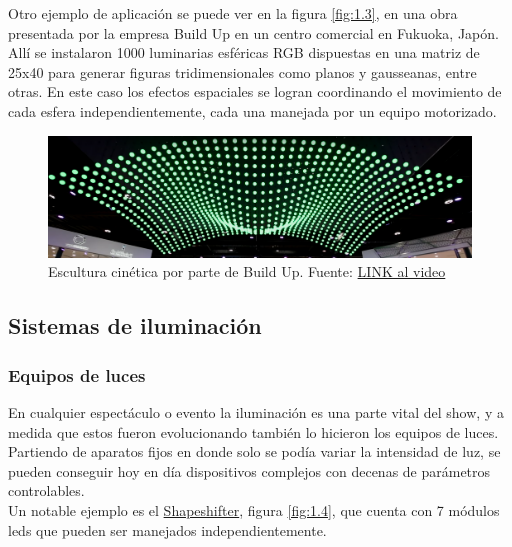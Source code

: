 Otro ejemplo de aplicación se puede ver en la figura \ref{fig:1.3}, en una obra presentada por la empresa Build Up en un centro comercial en Fukuoka, Japón. Allí se instalaron 1000 luminarias esféricas RGB dispuestas en una matriz de 25x40 para generar figuras tridimensionales como planos y gausseanas, entre otras. En este caso los efectos espaciales se logran coordinando el movimiento de cada esfera independientemente, cada una manejada por un equipo motorizado.
\begin{figure}[!ht]
	\centering
	\includegraphics[width=15cm,scale=1]{resources/1_3-kinSculp.png}
	\caption{ Escultura cinética por parte de Build Up. Fuente: \href{https://www.youtube.com/watch?v=ICixCazf6-k}{LINK al video} }
	\label{fig:\thefigure}
\end{figure}



\subsection{Sistemas de iluminación} 
\subsubsection{Equipos de luces}
En cualquier espectáculo o evento la iluminación es una parte vital del show, y a medida que estos fueron evolucionando también lo hicieron los equipos de luces. Partiendo de aparatos fijos en donde solo se podía variar la intensidad de luz, se pueden conseguir hoy en día dispositivos complejos con decenas de parámetros controlables.\\
Un notable ejemplo es el \href{http://preworks.at/index.php/en/products/led-automated-luminairies/shapeshifter}{Shapeshifter}, figura \ref{fig:1.4}, que cuenta con 7 módulos leds que pueden ser manejados independientemente.

